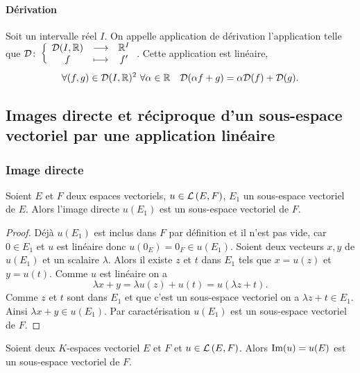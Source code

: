 \paragraph{Dérivation}
Soit un intervalle réel \(I\). On appelle application de dérivation
l'application telle que \(\mathcal{D}\colon\left\{\begin{array}{ccc}\mathcal{D}(I,\mathbb{R}) & \longrightarrow &\mathbb{R}^I\\f & \longmapsto & f'\end{array}\right.\). Cette
application est linéaire,
\begin{equation}
  \forall (f,g) \in \mathcal{D}(I,\mathbb{R})^2 \ \forall \alpha \in \mathbb{R} \quad \mathcal{D}(\alpha
  f+g)= \alpha \mathcal{D}(f)+\mathcal{D}(g).
\end{equation}

\subsection{Images directe et réciproque d'un sous-espace vectoriel par une
application linéaire}

\subsubsection{Image directe}

\begin{theo}
  Soient \(E\) et \(F\) deux espaces vectoriels, \(u \in \mathcal{L}\left(E,F\right)\), \(E_1\)
  un sous-espace vectoriel de \(E\). Alors l'image directe \(u(E_1)\) est un
  sous-espace vectoriel de \(F\).
\end{theo}

\begin{proof}
  Déjà \(u(E_1)\) est inclus dans \(F\) par définition et il n'est pas vide, car
  \(0 \in E_1\) et \(u\) est linéaire donc \(u(0_E)=0_F \in u(E_1)\). Soient
  deux vecteurs \(x,y\) de \(u(E_1)\) et un scalaire \(\lambda\). Alors il
  existe \(z\) et \(t\) dans \(E_1\) tels que \(x=u(z)\) et \(y=u(t)\). Comme
  \(u\) est linéaire on a
  \begin{equation}
    \lambda x +y = \lambda u(z)+u(t)=u(\lambda z+t).
  \end{equation}
  Comme \(z\) et \(t\) sont dans \(E_1\) et que c'est un sous-espace vectoriel
  on a \(\lambda z +t \in E_1\). Ainsi \(\lambda x + y \in u(E_1)\). Par
  caractérisation \(u(E_1)\) est un sous-espace vectoriel de \(F\).
\end{proof}
%
\begin{corth}
  Soient deux \(K\)-espaces vectoriel \(E\) et \(F\) et \(u \in \mathcal{L}\left(E,F\right)\).
  Alors \(\operatorname{Im}(u)=u(E)\) est un sous-espace vectoriel de \(F\).
\end{corth}

